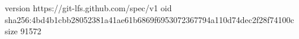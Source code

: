 version https://git-lfs.github.com/spec/v1
oid sha256:4bd4b1cbb28052381a41ae61b6869f6953072367794a110d74dec2f28f74100c
size 91572
